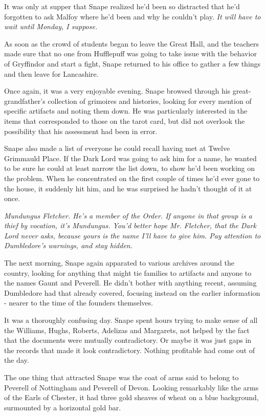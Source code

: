 \documentclass[a4paper,11pt]{article}
\begin{document}
It was only at supper that Snape realized he'd been so distracted that he'd forgotten to ask Malfoy where he'd been and why he couldn't play. \emph{It will have to wait until Monday, I suppose.}

As soon as the crowd of students began to leave the Great Hall, and the teachers made sure that no one from Hufflepuff was going to take issue with the behavior of Gryffindor and start a fight, Snape returned to his office to gather a few things and then leave for Lancashire.

Once again, it was a very enjoyable evening. Snape browsed through his great-grandfather's collection of grimoires and histories, looking for every mention of specific artifacts and noting them down. He was particularly interested in the items that corresponded to those on the tarot card, but did not overlook the possibility that his assessment had been in error.

Snape also made a list of everyone he could recall having met at Twelve Grimmauld Place. If the Dark Lord was going to ask him for a name, he wanted to be sure he could at least narrow the list down, to show he'd been working on the problem. When he concentrated on the first couple of times he'd ever gone to the house, it suddenly hit him, and he was surprised he hadn't thought of it at once.

\emph{Mundungus Fletcher. He's a member of the Order. If anyone in that group is a thief by vocation, it's Mundungus. You'd better hope Mr. Fletcher, that the Dark Lord never asks, because yours is the name I'll have to give him. Pay attention to Dumbledore's warnings, and stay hidden.}

The next morning, Snape again apparated to various archives around the country, looking for anything that might tie families to artifacts and anyone to the names Gaunt and Peverell. He didn't bother with anything recent, assuming Dumbledore had that already covered, focusing instead on the earlier information - nearer to the time of the founders themselves.

It was a thoroughly confusing day. Snape spent hours trying to make sense of all the Williams, Hughs, Roberts, Adelizas and Margarets, not helped by the fact that the documents were mutually contradictory. Or maybe it was just gaps in the records that made it look contradictory. Nothing profitable had come out of the day.

The one thing that attracted Snape was the coat of arms said to belong to Peverell of Nottingham and Peverell of Devon. Looking remarkably like the arms of the Earls of Chester, it had three gold sheaves of wheat on a blue background, surmounted by a horizontal gold bar.
\end{document}
